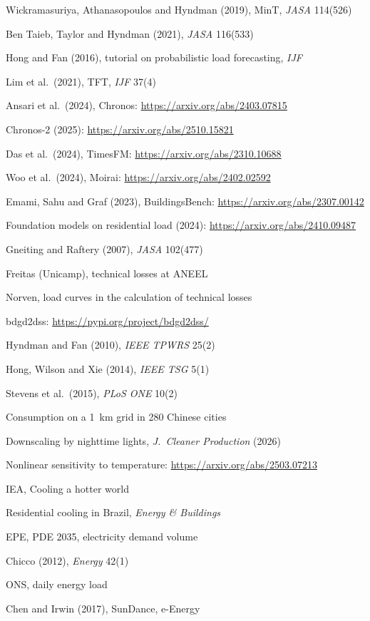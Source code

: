 {\begin{enumerate}[label={[\arabic*]},leftmargin=2.2em,itemsep=1pt]
\item Wickramasuriya, Athanasopoulos and Hyndman (2019), MinT, \emph{JASA} 114(526)
\item Ben Taieb, Taylor and Hyndman (2021), \emph{JASA} 116(533)
\item Hong and Fan (2016), tutorial on probabilistic load forecasting, \emph{IJF}
\item Lim et al.\ (2021), TFT, \emph{IJF} 37(4)
\item Ansari et al.\ (2024), Chronos: \url{https://arxiv.org/abs/2403.07815}
\item Chronos-2 (2025): \url{https://arxiv.org/abs/2510.15821}
\item Das et al.\ (2024), TimesFM: \url{https://arxiv.org/abs/2310.10688}
\item Woo et al.\ (2024), Moirai: \url{https://arxiv.org/abs/2402.02592}
\item Emami, Sahu and Graf (2023), BuildingsBench: \url{https://arxiv.org/abs/2307.00142}
\item Foundation models on residential load (2024): \url{https://arxiv.org/abs/2410.09487}
\item Gneiting and Raftery (2007), \emph{JASA} 102(477)
\item Freitas (Unicamp), technical losses at ANEEL
\item Norven, load curves in the calculation of technical losses
\item bdgd2dss: \url{https://pypi.org/project/bdgd2dss/}
\item Hyndman and Fan (2010), \emph{IEEE TPWRS} 25(2)
\item Hong, Wilson and Xie (2014), \emph{IEEE TSG} 5(1)
\item Stevens et al.\ (2015), \emph{PLoS ONE} 10(2)
\item Consumption on a 1~km grid in 280 Chinese cities
\item Downscaling by nighttime lights, \emph{J.\ Cleaner Production} (2026)
\item Nonlinear sensitivity to temperature: \url{https://arxiv.org/abs/2503.07213}
\item IEA, Cooling a hotter world
\item Residential cooling in Brazil, \emph{Energy \& Buildings}
\item EPE, PDE 2035, electricity demand volume
\item Chicco (2012), \emph{Energy} 42(1)
\item ONS, daily energy load
\item Chen and Irwin (2017), SunDance, e-Energy

\end{enumerate}}
